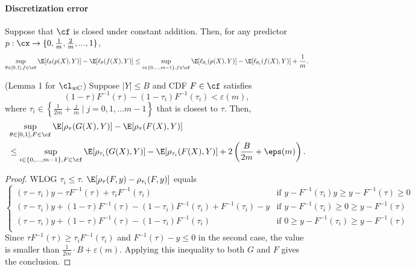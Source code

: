 \paragraph{Discretization error}
\begin{lemma}
Suppose that $\cf$ is closed under constant addition.  Then, for any predictor $p: \cx \to \{0,\frac{1}{m},\frac{2}{m},...,1\}$, 
\[
\sup_{\theta\in[0,1], f\in\cf} \E[\ell_\theta(p(X),Y)] - \E[\ell_\theta(f(X),Y)] 
\leq \sup_{i \in \{0,...,m-1\}, f\in\cf} \E[\ell_{\theta_i}(p(X),Y)] - \E[\ell_{\theta_i}(f(X),Y)] + \frac{1}{m}.
\]
\end{lemma}

\begin{lemma}(Lemma 1 for $\cl_{wC}$)
Suppose $|Y| \leq B$ and CDF $F\in\cf$ satisfies 
\[(1-\tau)F^{-1}(\tau) - (1-\tau_i)F^{-1}(\tau_i) < \varepsilon(m),
\]
where $\tau_i \in \left\{\frac{1}{2m} + \frac{j}{m}\mid j=0,1,...m-1\right\}$ that is closest to $\tau$. Then, 
\begin{align*}
& \sup_{\theta\in[0,1], F\in\cf} \E[\rho_\tau(G(X),Y)] - \E[\rho_\tau(F(X),Y)]  \\
& \leq \sup_{i \in \{0,...,m-1\}, F\in\cf} \E[\rho_{\tau_i}(G(X),Y)] - \E[\rho_{\tau_i}(F(X),Y)] + 2\left(\frac{B}{2m}+\eps(m)\right).
\end{align*}
\end{lemma}

\begin{proof}
WLOG $\tau_i \leq \tau$. $\E[\rho_\tau(F, y) - \rho_{\tau_i}(F,y)]$ equals 
\[\begin{cases}
    (\tau-\tau_i)y - \tau F^{-1}(\tau) + \tau_i F^{-1}(\tau_i) & \text{if } y-F^{-1}(\tau_i)y \geq y-F^{-1}(\tau) \geq 0 \\
    (\tau-\tau_i)y + (1-\tau)F^{-1}(\tau) - (1-\tau_i)F^{-1}(\tau_i) + F^{-1}(\tau_i) -y& \text{if } y-F^{-1}(\tau_i) \geq 0 \geq y-F^{-1}(\tau) \\
    (\tau-\tau_i)y + (1-\tau)F^{-1}(\tau) - (1-\tau_i)F^{-1}(\tau_i) & \text{if } 0 \geq y-F^{-1}(\tau_i) \geq y-F^{-1}(\tau) \\
\end{cases}
\]
Since $\tau F^{-1}(\tau) \geq \tau_i F^{-1}(\tau_i)$ and $F^{-1}(\tau)-y \leq 0$ in the second case, the value is smaller than $\frac{1}{2m}\cdot B+\varepsilon(m)$. Applying this inequality to both $G$ and $F$ gives the conclusion.
\end{proof}

